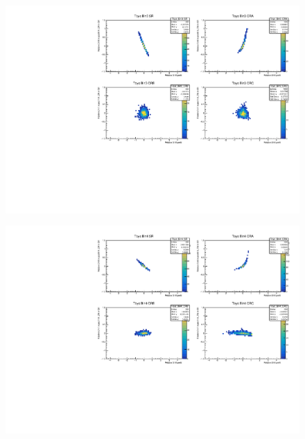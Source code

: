 \begin{figure}[H]
\includegraphics[width=\textwidth]{plots/diffx/instab/constfx/instabilities_mjj_QCD_Mgraph_Signal_Sh2211_BSMCQCDSTATS_madgraphasimov_bin3.pdf}
\end{figure}
\begin{figure}[H]
\includegraphics[width=\textwidth]{plots/diffx/instab/constfx/instabilities_mjj_QCD_Mgraph_Signal_Sh2211_BSMCQCDSTATS_madgraphasimov_bin4.pdf}
\end{figure}


